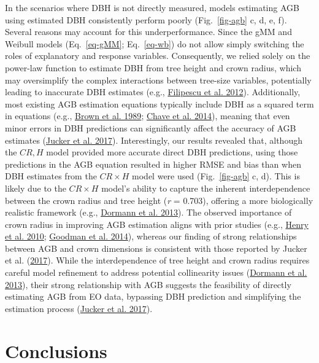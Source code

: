 \documentclass[
  12pt,
  letterpaper,
  DIV=11,
  numbers=noendperiod]{scrartcl}
\begin{document}
In the scenarios where DBH is not directly measured, models estimating
AGB using estimated DBH consistently perform poorly (Fig.~\ref{fig-agb}
c, d, e, f). Several reasons may account for this underperformance.
Since the gMM and Weibull models (Eq.~\ref{eq-gMM}; Eq.~\ref{eq-wb}) do
not allow simply switching the roles of explanatory and response
variables. Consequently, we relied solely on the power-law function to
estimate DBH from tree height and crown radius, which may oversimplify
the complex interactions between tree-size variables, potentially
leading to inaccurate DBH estimates (e.g.,
\protect\hyperlink{ref-Filipescu2012}{Filipescu et al. 2012}).
Additionally, most existing AGB estimation equations typically include
DBH as a squared term in equations (e.g.,
\protect\hyperlink{ref-Brown1989}{Brown et al. 1989};
\protect\hyperlink{ref-Chave2014}{Chave et al. 2014}), meaning that even
minor errors in DBH predictions can significantly affect the accuracy of
AGB estimates (\protect\hyperlink{ref-Jucker2017}{Jucker et al. 2017}).
Interestingly, our results revealed that, although the \(CR,H\) model
provided more accurate direct DBH predictions, using those predictions
in the AGB equation resulted in higher RMSE and bias than when DBH
estimates from the \(CR \times H\) model were used (Fig.~\ref{fig-agb}
c, d). This is likely due to the \(CR \times H\) model's ability to
capture the inherent interdependence between the crown radius and tree
height (\emph{r} = 0.703), offering a more biologically realistic
framework (e.g., \protect\hyperlink{ref-Dormann2013}{Dormann et al.
2013}). The observed importance of crown radius in improving AGB
estimation aligns with prior studies (e.g.,
\protect\hyperlink{ref-Henry2010}{Henry et al. 2010};
\protect\hyperlink{ref-Goodman2014}{Goodman et al. 2014}), whereas our
finding of strong relationships between AGB and crown dimensions is
consistent with those reported by Jucker et al.
(\protect\hyperlink{ref-Jucker2017}{2017}). While the interdependence of
tree height and crown radius requires careful model refinement to
address potential collinearity issues
(\protect\hyperlink{ref-Dormann2013}{Dormann et al. 2013}), their strong
relationship with AGB suggests the feasibility of directly estimating
AGB from EO data, bypassing DBH prediction and simplifying the
estimation process (\protect\hyperlink{ref-Jucker2017}{Jucker et al.
2017}).

\hypertarget{conclusions}{%
\section{Conclusions}\label{conclusions}}
\end{document}
